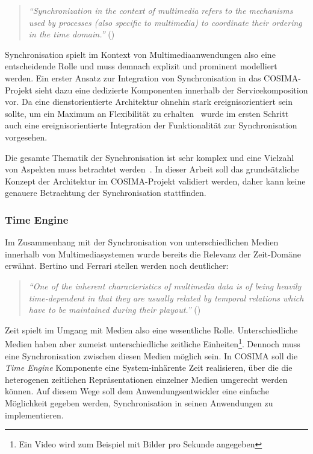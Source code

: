   \begin{quote}
    \emph{"`Synchronization in the context of multimedia refers to the mechanisms used by processes (also specific to multimedia) to coordinate their ordering in the time domain."'} (\citep[S. 401]{steinmetz1990spm})
  \end{quote}
  
  Synchronisation spielt im Kontext von Multimediaanwendungen also eine entscheidende Rolle und muss demnach explizit und prominent modelliert werden. Ein erster Ansatz zur Integration von Synchronisation in das COSIMA-Projekt sieht dazu eine dedizierte Komponenten innerhalb der Servicekomposition vor. Da eine dienstorientierte Architektur ohnehin stark ereignisorientiert sein sollte, um ein Maximum an Flexibilität zu erhalten~\citep[S. 96]{masak2007ssb} wurde im ersten Schritt auch eine ereignisorientierte Integration der Funktionalität zur Synchronisation vorgesehen.
  
  Die gesamte Thematik der Synchronisation ist sehr komplex und eine Vielzahl von Aspekten muss betrachtet werden~\citep[S. 27ff]{bericht}. In dieser Arbeit soll das grundsätzliche Konzept der Architektur im COSIMA-Projekt validiert werden, daher kann keine genauere Betrachtung der Synchronisation stattfinden.


\subsubsection{Time Engine} %
\label{ssub:time_engine}

  Im Zusammenhang mit der Synchronisation von unterschiedlichen Medien innerhalb von Multimediasystemen wurde bereits die Relevanz der Zeit-Domäne erwähnt. Bertino und Ferrari stellen werden noch deutlicher:

  \begin{quote}
    \emph{"`One of the inherent characteristics of multimedia data is of being heavily time-dependent in that they are usually related by temporal relations which have to be maintained during their playout."'} (\citep[S. 612]{bertino1998tsm})
  \end{quote}
  
  Zeit spielt im Umgang mit Medien also eine wesentliche Rolle. Unterschiedliche Medien haben aber zumeist unterschiedliche zeitliche Einheiten\footnote{Ein Video wird zum Beispiel mit Bilder pro Sekunde angegeben}. Dennoch muss eine Synchronisation zwischen diesen Medien möglich sein. In COSIMA soll die \emph{Time Engine} Komponente eine System-inhärente Zeit realisieren, über die die heterogenen zeitlichen Repräsentationen einzelner Medien umgerecht werden können. Auf diesem Wege soll dem Anwendungsentwickler eine einfache Möglichkeit gegeben werden, Synchronisation in seinen Anwendungen zu implementieren.

